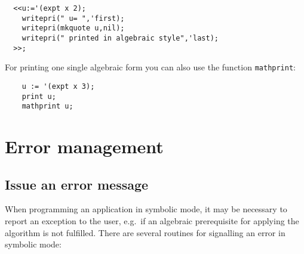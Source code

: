 \begin{verbatim}
  <<u:='(expt x 2);
    writepri(" u= ",'first);
    writepri(mkquote u,nil);
    writepri(" printed in algebraic style",'last);
  >>;
\end{verbatim}

For printing one single algebraic form you can also use the
function {\tt mathprint}:

\begin{verbatim}
    u := '(expt x 3);
    print u;
    mathprint u; 
\end{verbatim}
\section{Error management}

\subsection{Issue an error message}
When programming an application in symbolic mode, it may be
necessary to report an exception to the user, e.g.\  
if an algebraic prerequisite for applying the algorithm is
not fulfilled.
There are several routines for signalling an error in
symbolic mode:

